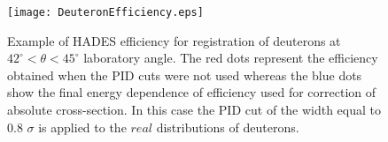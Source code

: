    \begin{figure}[!ht]
        \centering
        \texttt{[image: DeuteronEfficiency.eps]}
        \caption{Example of HADES efficiency for registration of deuterons at $42^\circ < \theta< 45^\circ$
        laboratory angle. The red dots represent the efficiency obtained when the PID cuts were not
        used whereas the blue dots show the final energy dependence
        of efficiency used for correction of absolute cross-section. In this case the PID cut of the width equal to 0.8 $\sigma$ 
        is applied to the $real$ distributions of deuterons.}
        \label{Deuteron_efficiency}
    \end{figure}
  





